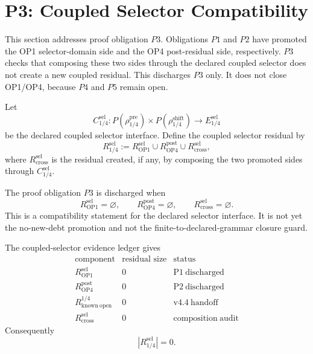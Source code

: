 
\section{P3: Coupled Selector Compatibility}
\label{sec:v45-p3-coupled-selector-compatibility}

This section addresses proof obligation \(P3\).  Obligations \(P1\) and \(P2\)
have promoted the OP1 selector-domain side and the OP4 post-residual side,
respectively.  \(P3\) checks that composing these two sides through the
declared coupled selector does not create a new coupled residual.  This
discharges \(P3\) only.  It does not close OP1/OP4, because \(P4\) and \(P5\)
remain open.

\begin{definition}
Let
\[
    C_{1/4}^{\mathrm{sel}}:
    P(\rho_{1/4}^{\mathrm{pre}})
    \times
    P(\rho_{1/4}^{\mathrm{shift}})
    \longrightarrow
    E_{1/4}^{\mathrm{sel}}
\]
be the declared coupled selector interface.  Define the coupled selector
residual by
\[
    R_{1/4}^{\mathrm{sel}}
    :=
    R_{\mathrm{OP1}}^{\mathrm{sel}}
    \cup
    R_{\mathrm{OP4}}^{\mathrm{post}}
    \cup
    R_{\mathrm{cross}}^{\mathrm{sel}},
\]
where \(R_{\mathrm{cross}}^{\mathrm{sel}}\) is the residual created, if any, by
composing the two promoted sides through \(C_{1/4}^{\mathrm{sel}}\).
\end{definition}

\begin{definition}
The proof obligation \(P3\) is discharged when
\[
    R_{\mathrm{OP1}}^{\mathrm{sel}}=\varnothing,\qquad
    R_{\mathrm{OP4}}^{\mathrm{post}}=\varnothing,\qquad
    R_{\mathrm{cross}}^{\mathrm{sel}}=\varnothing.
\]
This is a compatibility statement for the declared selector interface.  It is
not yet the no-new-debt promotion and not the finite-to-declared-grammar
closure guard.
\end{definition}

\begin{proposition}
The coupled-selector evidence ledger gives
\[
\begin{array}{c|r|c}
\text{component} & \text{residual size} & \text{status}\\
\hline
R_{\mathrm{OP1}}^{\mathrm{sel}} & 0 & \mathrm{P1\ discharged}\\
R_{\mathrm{OP4}}^{\mathrm{post}} & 0 & \mathrm{P2\ discharged}\\
R_{\mathrm{known\ open}}^{1/4} & 0 & \mathrm{v4.4\ handoff}\\
R_{\mathrm{cross}}^{\mathrm{sel}} & 0 & \mathrm{composition\ audit}
\end{array}
\]
Consequently
\[
    |R_{1/4}^{\mathrm{sel}}|=0.
\]
\end{proposition}

